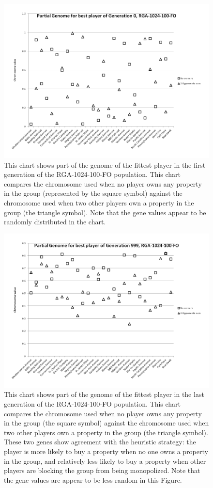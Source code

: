\begin{figure}[htp]
\centerline{\includegraphics[width=0.85\columnwidth]{Figures/genome000.png}}
\caption[Illustration of Genome, Generation 0]{This chart shows part of the
genome of the fittest player in the first generation of the RGA-1024-100-FO
population. This chart compares the chromosome used when no player owns any
property in the group (represented by the square symbol) against the chromosome
used when two other players own a property in the group (the triangle symbol).
Note that the gene values appear to be randomly distributed in the chart.}
\label{figure-genome0}
\end{figure}

\begin{figure}[htp]
\centerline{\includegraphics[width=0.85\columnwidth]{Figures/genome999.png}}
\caption[Illustration of Genome, Generation 999]{This chart shows part of the
genome of the fittest player in the last generation of the RGA-1024-100-FO
population. This chart compares the chromosome used when no player owns any
property in the group (the square symbol) against the chromosome used when two
other players own a property in the group (the triangle symbol). These two genes
show agreement with the heuristic strategy: the player is more likely to buy a
property when no one owns a property in the group, and relatively less likely to
buy a property when other players are blocking the group from being monopolized.
Note that the gene values are appear to be less random in this Figure.}
\label{figure-genome999}
\end{figure}

